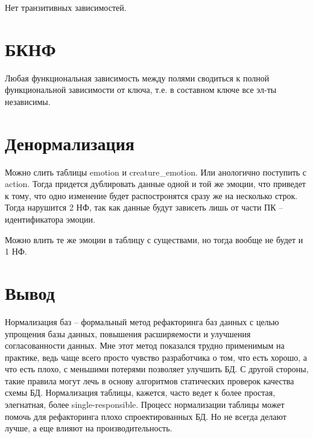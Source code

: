 \documentclass{article}
\begin{document}
Нет транзитивных зависимостей.

\section{БКНФ}

Любая функциональная
зависимость между полями
сводиться к полной
функциональной зависимости от
ключа, т.е. в составном
ключе все эл-ты независимы.

\section{Денормализация}

Можно слить таблицы emotion и creature\_emotion.
Или анологично поступить с action. Тогда 
придется дублировать данные одной и той же эмоции,
что приведет к тому, что одно изменение будет 
распостронятся сразу же на несколько строк.
Тогда нарушится 2 НФ, так как данные будут зависеть
лишь от части ПК -- идентификатора эмоции.

Можно влить те же эмоции в таблицу
с существами, но тогда вообще не будет и 
1 НФ.

\section{Вывод}

Нормализация баз -- формальный метод рефакторинга 
баз данных с целью упрощения базы данных, 
повышения расширяемости и улучшения согласованности
данных. Мне этот метод показался трудно применимым
на практике, ведь чаще всего просто чувство 
разработчика о том, что есть хорошо, а что есть
плохо, с меньшими потерями позволяет улучшить БД.
С другой стороны, такие правила могут лечь в 
основу алгоритмов статических проверок качества 
схемы БД. Нормализация таблицы,
кажется, часто ведет к
более простая, элегнатная,
более single-responsible.
Процесс нормализации таблицы
может помочь для рефакторинга
плохо спроектированных БД.
Но не всегда делают лучше,
а еще влияют на
производительность.

    
\end{document}
